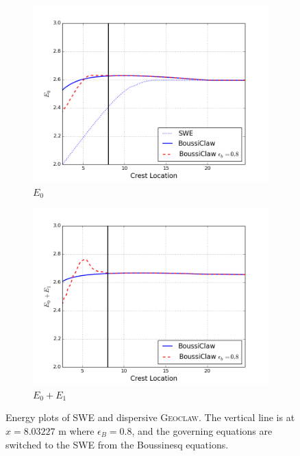 \documentclass[review]{elsarticle}
\begin{document}
\begin{figure}[!htb]
    \centering
    \begin{subfigure}[b]{0.45\textwidth}
        \includegraphics[width=\textwidth]{_fig/e0_dgeo_eb08.png}
        \caption{$E_0$}
        \label{fig:e0_dgeo_eb08}
    \end{subfigure}
    \begin{subfigure}[b]{0.45\textwidth}
        \includegraphics[width=\textwidth]{_fig/e1_dgeo_eb08.png}
        \caption{$E_0+E_1$}
        \label{fig:e1_dgeo_eb08}
    \end{subfigure}
    \caption{Energy plots of SWE and dispersive \textsc{Geoclaw}.
    The vertical line is at $x=8.03227$ m where $\epsilon_B=0.8$,
    and the governing equations are switched to the SWE from
    the Boussinesq equations. }
    \label{fig:energy_dgeo_swe}
\end{figure}
\end{document}
